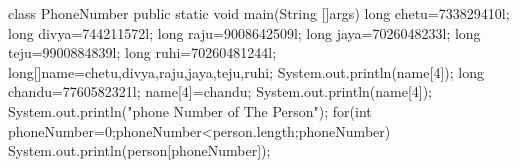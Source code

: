 class PhoneNumber{
public static void main(String []args){
long chetu=733829410l;
long divya=744211572l;
long raju=9008642509l;
long jaya=7026048233l;
long teju=9900884839l;
long ruhi=70260481244l;
long[]name={chetu,divya,raju,jaya,teju,ruhi};
System.out.println(name[4]);
long chandu=7760582321l;
name[4]=chandu;
System.out.println(name[4]);
System.out.println("phone Number of The Person");
for(int phoneNumber=0;phoneNumber<person.length;phoneNumber)
System.out.println(person[phoneNumber]);
}
}